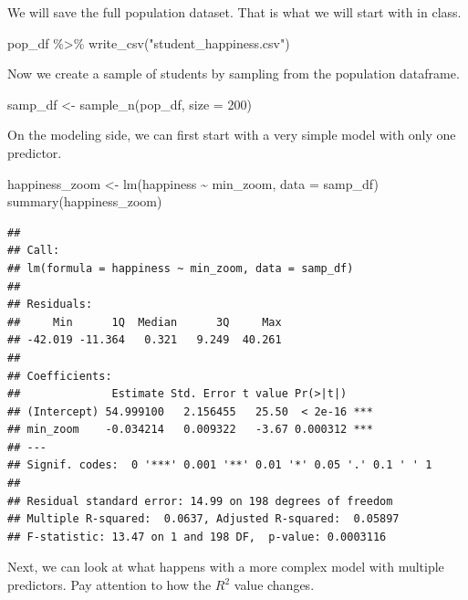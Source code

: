 \documentclass[
]{book}
\newenvironment{Shaded}{\begin{snugshade}}{\end{snugshade}}
\newcommand{\AttributeTok}[1]{\textcolor[rgb]{0.77,0.63,0.00}{#1}}
\newcommand{\DecValTok}[1]{\textcolor[rgb]{0.00,0.00,0.81}{#1}}
\newcommand{\FunctionTok}[1]{\textcolor[rgb]{0.00,0.00,0.00}{#1}}
\newcommand{\NormalTok}[1]{#1}
\newcommand{\OtherTok}[1]{\textcolor[rgb]{0.56,0.35,0.01}{#1}}
\newcommand{\SpecialCharTok}[1]{\textcolor[rgb]{0.00,0.00,0.00}{#1}}
\newcommand{\StringTok}[1]{\textcolor[rgb]{0.31,0.60,0.02}{#1}}
\begin{document}
We will save the full population dataset. That is what we will start with in class.

\begin{Shaded}
\begin{Highlighting}[]
\NormalTok{pop\_df }\SpecialCharTok{\%\textgreater{}\%} \FunctionTok{write\_csv}\NormalTok{(}\StringTok{"student\_happiness.csv"}\NormalTok{)}
\end{Highlighting}
\end{Shaded}

Now we create a sample of students by sampling from the population dataframe.

\begin{Shaded}
\begin{Highlighting}[]
\NormalTok{samp\_df }\OtherTok{\textless{}{-}} \FunctionTok{sample\_n}\NormalTok{(pop\_df, }\AttributeTok{size =} \DecValTok{200}\NormalTok{)}
\end{Highlighting}
\end{Shaded}

On the modeling side, we can first start with a very simple model with only one predictor.

\begin{Shaded}
\begin{Highlighting}[]
\NormalTok{happiness\_zoom }\OtherTok{\textless{}{-}} \FunctionTok{lm}\NormalTok{(happiness }\SpecialCharTok{\textasciitilde{}}\NormalTok{ min\_zoom, }\AttributeTok{data =}\NormalTok{ samp\_df)}
\FunctionTok{summary}\NormalTok{(happiness\_zoom)}
\end{Highlighting}
\end{Shaded}

\begin{verbatim}
## 
## Call:
## lm(formula = happiness ~ min_zoom, data = samp_df)
## 
## Residuals:
##     Min      1Q  Median      3Q     Max 
## -42.019 -11.364   0.321   9.249  40.261 
## 
## Coefficients:
##              Estimate Std. Error t value Pr(>|t|)    
## (Intercept) 54.999100   2.156455   25.50  < 2e-16 ***
## min_zoom    -0.034214   0.009322   -3.67 0.000312 ***
## ---
## Signif. codes:  0 '***' 0.001 '**' 0.01 '*' 0.05 '.' 0.1 ' ' 1
## 
## Residual standard error: 14.99 on 198 degrees of freedom
## Multiple R-squared:  0.0637, Adjusted R-squared:  0.05897 
## F-statistic: 13.47 on 1 and 198 DF,  p-value: 0.0003116
\end{verbatim}

Next, we can look at what happens with a more complex model with multiple predictors. Pay attention to how the \(R^2\) value changes.
\end{document}
